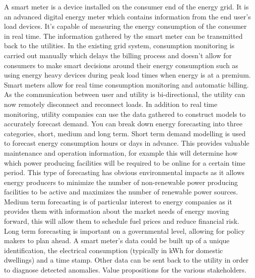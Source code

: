 A smart meter is a device installed on the consumer end of the energy grid. It is an advanced digital energy meter which contains information from the end user's load devices. It's capable of measuring the energy consumption of the consumer in real time. The information gathered by the smart meter can be transmitted back to the utilities. In the existing grid system, consumption monitoring is carried out manually which delays the billing process and doesn't allow for consumers to make smart decisions around their energy consumption such as using energy heavy devices during peak load times when energy is at a premium. Smart meters allow for real time consumption monitoring and automatic billing. As the communication between user and utility is bi-directional, the utility can now remotely disconnect and reconnect loads. In addition to real time monitoring, utility companies can use the data gathered to construct models to accurately forecast demand.  You can break down energy forecasting into three categories, short, medium and long term. Short term demand modelling is used to forecast energy consumption hours or days in advance. This provides valuable maintenance and operation information, for example this will determine how which power producing facilities will be required to be online for a certain time period. This type of forecasting has obvious environmental impacts as it allows energy producers to minimize the number of non-renewable power producing facilities to be active and maximizes the number of renewable power sources. Medium term forecasting is of particular interest to energy companies as it provides them with information about the market needs of energy moving forward, this will allow them to schedule fuel prices and reduce financial risk. Long term forecasting is important on a governmental level, allowing for policy makers to plan ahead. A smart meter's data could be built up of a unique identification, the electrical consumption (typically in kWh for domestic dwellings) and a time stamp. Other data can be sent back to the utility in order to diagnose detected anomalies. Value propositions for the various stakeholders. 
